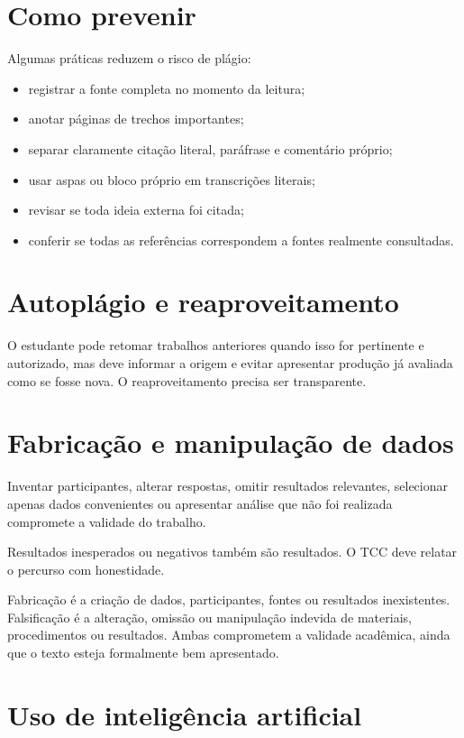 \section{Como prevenir}

Algumas práticas reduzem o risco de plágio:

\begin{itemize}
  \item registrar a fonte completa no momento da leitura;
  \item anotar páginas de trechos importantes;
  \item separar claramente citação literal, paráfrase e comentário próprio;
  \item usar aspas ou bloco próprio em transcrições literais;
  \item revisar se toda ideia externa foi citada;
  \item conferir se todas as referências correspondem a fontes realmente consultadas.
\end{itemize}

\section{Autoplágio e reaproveitamento}

O estudante pode retomar trabalhos anteriores quando isso for pertinente e autorizado, mas deve informar a origem e evitar apresentar produção já avaliada como se fosse nova. O reaproveitamento precisa ser transparente.

\section{Fabricação e manipulação de dados}

Inventar participantes, alterar respostas, omitir resultados relevantes, selecionar apenas dados convenientes ou apresentar análise que não foi realizada compromete a validade do trabalho.

Resultados inesperados ou negativos também são resultados. O TCC deve relatar o percurso com honestidade.

Fabricação é a criação de dados, participantes, fontes ou resultados inexistentes. Falsificação é a alteração, omissão ou manipulação indevida de materiais, procedimentos ou resultados. Ambas comprometem a validade acadêmica, ainda que o texto esteja formalmente bem apresentado.

\section{Uso de inteligência artificial}

